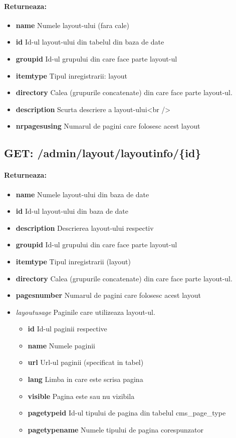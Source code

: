 \paragraph{Returneaza:}
\begin{itemize}
\item \textbf{name}
 Numele layout-ului (fara cale)
\item \textbf{id}
 Id-ul layout-ului din tabelul din baza de date
\item \textbf{groupid}
 Id-ul grupului din care face parte layout-ul
\item \textbf{itemtype}
 Tipul inregistrarii: layout
\item \textbf{directory}
 Calea (grupurile concatenate) din care face parte layout-ul.
\item \textbf{description}
 Scurta descriere a layout-ului<br />
\item \textbf{nrpagesusing}
 Numarul de pagini care folosesc acest layout
 \end{itemize}
 \subsection*{GET: /admin/layout/layoutinfo/\{id\}}

\paragraph{Returneaza:}
\begin{itemize}
\item \textbf{name}
 Numele layout-ului din baza de date
\item \textbf{id}
 Id-ul layout-ului din baza de date
\item \textbf{description}
 Descrierea layout-ului respectiv
\item \textbf{groupid}
 Id-ul grupului din care face parte layout-ul
\item \textbf{itemtype}
 Tipul inregistrarii (layout)
\item \textbf{directory}
 Calea (grupurile concatenate) din care face parte layout-ul.
\item \textbf{pagesnumber}
 Numarul de pagini care folosesc acest layout
\item \textit{layoutusage}
 Paginile care utilizeaza layout-ul. \begin{itemize}
\item \textbf{id}
 Id-ul paginii respective
\item \textbf{name}
 Numele paginii 
\item \textbf{url}
 Url-ul paginii (specificat in tabel)
\item \textbf{lang}
 Limba in care este scrisa pagina
\item \textbf{visible}
 Pagina este sau nu vizibila
\item \textbf{pagetypeid}
 Id-ul tipului de pagina din tabelul cms\_page\_type
\item \textbf{pagetypename}
 Numele tipului de pagina corespunzator
 \end{itemize}
 \end{itemize}
